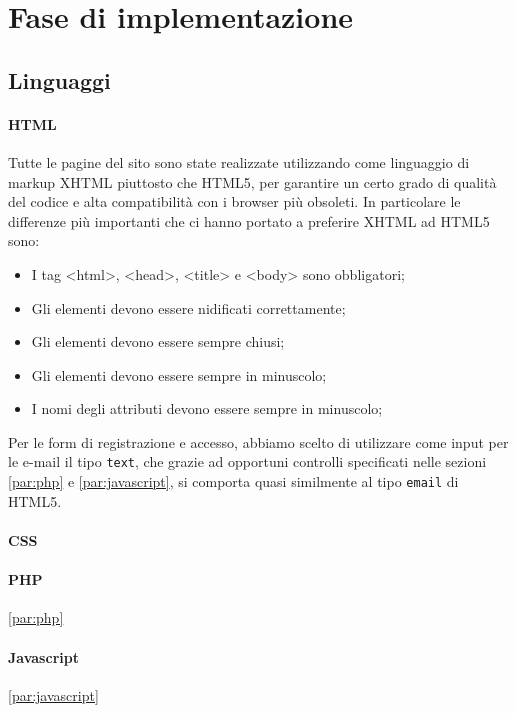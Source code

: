 \section{Fase di implementazione}
\label{sec:fase_di_implementazione}
\subsection{Linguaggi}
\paragraph{HTML}
Tutte le pagine del sito sono state realizzate utilizzando come linguaggio di markup XHTML piuttosto che HTML5, per garantire un certo grado di qualità del codice e alta compatibilità con i browser più obsoleti. In particolare le differenze più importanti che ci hanno portato a preferire XHTML ad HTML5 sono:
\begin{itemize}
    \item I tag <html>, <head>, <title> e <body> sono obbligatori;
    \item Gli elementi devono essere nidificati correttamente;
    \item Gli elementi devono essere sempre chiusi;
    \item Gli elementi devono essere sempre in minuscolo;
    \item I nomi degli attributi devono essere sempre in minuscolo;
\end{itemize}
Per le form di registrazione e accesso, abbiamo scelto di utilizzare come input per le e-mail il tipo \texttt{text}, che grazie ad opportuni controlli specificati nelle sezioni \ref{par:php} e \ref{par:javascript}, si comporta quasi similmente al tipo \texttt{email} di HTML5. %

\paragraph{CSS}

\paragraph{PHP}\ref{par:php}

\paragraph{Javascript}\ref{par:javascript}

